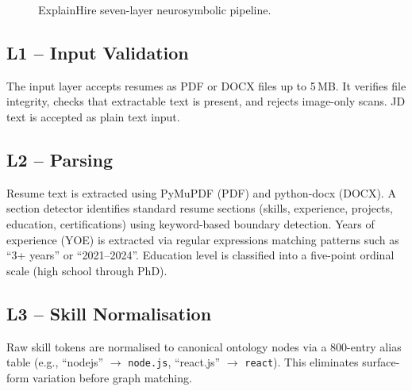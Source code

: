 \documentclass[conference]{IEEEtran}
\begin{document}
\begin{figure}[htbp]
\centering
{}
\caption{ExplainHire seven-layer neurosymbolic pipeline.}
\label{fig:pipeline}
\end{figure}

\subsection{L1 -- Input Validation}
The input layer accepts resumes as PDF or DOCX files up to 5\,MB. It
verifies file integrity, checks that extractable text is present, and rejects
image-only scans. JD text is accepted as plain text input.

\subsection{L2 -- Parsing}
Resume text is extracted using PyMuPDF (PDF) and python-docx (DOCX). A
section detector identifies standard resume sections (skills, experience,
projects, education, certifications) using keyword-based boundary detection.
Years of experience (YOE) is extracted via regular expressions matching
patterns such as ``3+ years'' or ``2021--2024''. Education level is
classified into a five-point ordinal scale (high school through PhD).

\subsection{L3 -- Skill Normalisation}
Raw skill tokens are normalised to canonical ontology nodes via a 800-entry
alias table (e.g., ``nodejs'' $\rightarrow$ \texttt{node.js},
``react.js'' $\rightarrow$ \texttt{react}). This eliminates surface-form
variation before graph matching.
\end{document}
